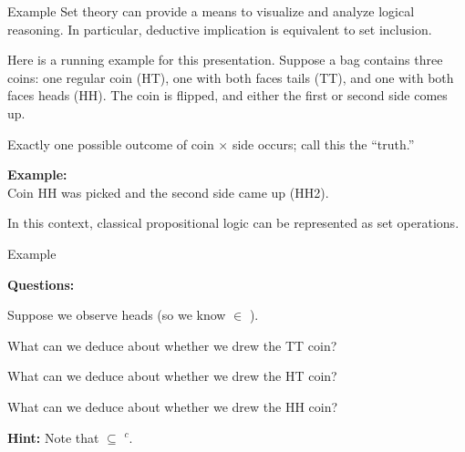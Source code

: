 \documentclass[8pt]{beamer}\usepackage[]{graphicx}\usepackage[]{color}
\begin{document}
\begin{frame}{Example}
%
Set theory can provide a means to visualize and analyze logical reasoning. In
particular, deductive implication is equivalent to set inclusion.

Here is a running example for this presentation. Suppose a bag contains three
coins: one regular coin (HT), one with both faces tails (TT), and one with both
faces heads (HH).  The coin is flipped, and either the first or second side
comes up.

Exactly one possible outcome
of coin $\times$ side occurs; call this the ``truth.''

\pause

\begin{minipage}{0.38\textwidth}
    \begin{center}
\end{center}
\end{minipage}
\begin{minipage}{0.58\textwidth}
    \textbf{Example:}\\
    Coin HH was picked and the second side came up (HH2).

    \vspace{1em} In this context, classical propositional logic can be
    represented as set operations.
\end{minipage}
%
\end{frame}


\begin{frame}{Example}

\setminipage{}
\pause
\textbf{Questions:}

Suppose we observe heads (so we know \truth{} $\in$ \heads{}).

What can we deduce about whether we drew the TT coin?

What can we deduce about whether we drew the HT coin?

What can we deduce about whether we drew the HH coin?

\textbf{Hint:}
%
Note that \heads{} $\subseteq$ \ttcoin{}$^c$.


\end{frame}
\end{document}
